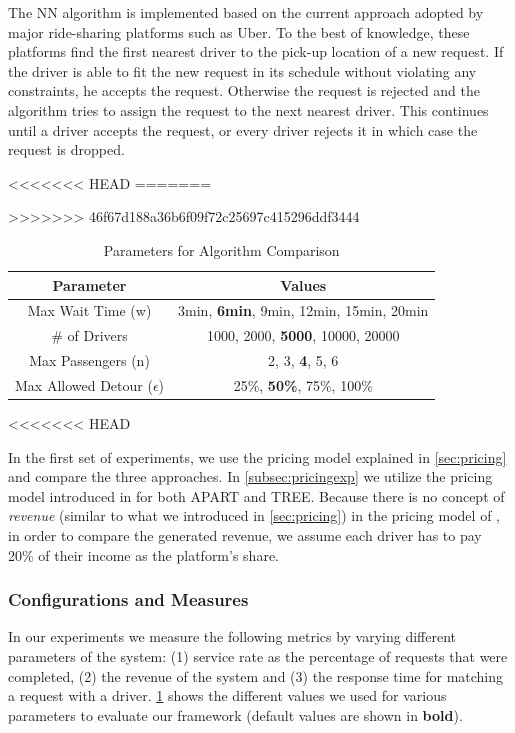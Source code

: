 The NN algorithm is implemented based on the current approach adopted by major ride-sharing platforms such as Uber. To the best of knowledge, these platforms find the first nearest driver to the pick-up location of a new request. If the driver is able to fit the new request in its schedule without violating any constraints, he accepts the request. Otherwise the request is rejected and the algorithm tries to assign the request to the next nearest driver. This continues until a driver accepts the request, or every driver rejects it in which case the request is dropped.

<<<<<<< HEAD
=======

>>>>>>> 46f67d188a36b6f09f72c25697c415296ddf3444
\begin{table}[!ht]
	\begin{center}
		\begin{tabular}{|c|c|}
			\hline
			Parameter & Values \\
			\hline \hline
			Max Wait Time (w) & 3min, \textbf{6min}, 9min, 12min, 15min, 20min \\ 
			\hline
			\# of Drivers & 1000, 2000, \textbf{5000},  10000, 20000\\ 
			\hline
			Max Passengers (n) & 2, 3, \textbf{4}, 5, 6 \\
			\hline
			Max Allowed Detour ($\epsilon$) & 25\%, \textbf{50\%}, 75\%, 100\%\\
			\hline
		\end{tabular}
		\caption{Parameters for Algorithm Comparison}
		\label{tab:params}
	\end{center}
	\vspace{-5mm}
\end{table}
<<<<<<< HEAD

In the first set of experiments, we use the pricing model explained in \cref{sec:pricing} and compare the three approaches. In \cref{subsec:pricingexp} we utilize the pricing model introduced in \cite{Ma15} for both APART and TREE. Because there is no concept of \textit{revenue} (similar to what we introduced in \cref{sec:pricing}) in the pricing model of \cite{Ma15}, in order to compare the generated revenue, we assume each driver has to pay 20\% of their income as the platform's share.

\subsubsection{Configurations and Measures}
In our experiments we measure the following metrics by varying different parameters of the system: (1) service rate as the percentage of requests that were completed, (2) the revenue of the system and (3) the response time for matching a request with a driver. \cref{tab:params} shows the different values we used for various parameters to evaluate our framework (default values are shown in \textbf{bold}).

